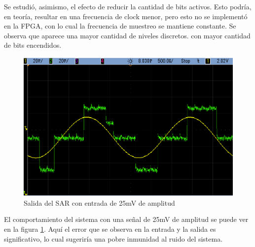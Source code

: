 \documentclass[assd_tp3_main.tex]{subfiles}
\begin{document}
Se estudi\'o, asimismo, el efecto de reducir la cantidad de bits activos. Esto podr\'ia, en teor\'ia, resultar en una frecuencia de clock menor, pero esto no se implement\'o en la FPGA, con lo cual la frecuencia de muestreo se mantiene constante. Se observa que aparece una mayor cantidad de niveles discretos. con mayor cantidad de bits encendidos.

\begin{figure}[htb!]
	\centering
	\includegraphics[width=\textwidth]
	{images/ej2/s__.png}
	\caption{Salida del SAR con entrada de 25mV de amplitud}
	\label{fig:sar-chiquita}
\end{figure}

El comportamiento del sistema con una se\~nal de 25mV de amplitud se puede ver en la figura \ref{fig:sar-chiquita}. Aqu\'i el error que se observa en la entrada y la salida es significativo, lo cual sugerir\'ia una pobre inmunidad al ruido del sistema.
\end{document}
